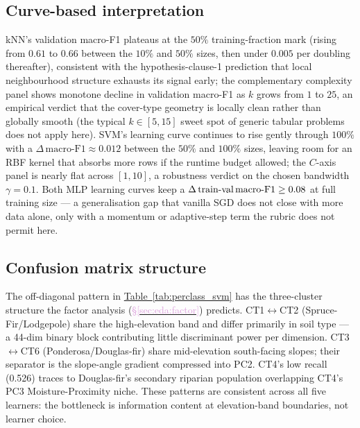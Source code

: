 \documentclass[conference]{IEEEtran}
\newcommand{\tabref}[1]{\hyperref[#1]{\textcolor{sage}{Table~\ref*{#1}}}}
\newcommand{\secref}[1]{\hyperref[#1]{\textcolor{plum}{\S\ref*{#1}}}}
\begin{document}
\subsection{Curve-based interpretation}\label{sec:disc:curves}
kNN's validation macro-F1 plateaus at the $50\%$ training-fraction mark
(rising from $0.61$ to $0.66$ between the $10\%$ and $50\%$ sizes, then under
$0.005$ per doubling thereafter), consistent with the hypothesis-clause-1
prediction that local neighbourhood structure exhausts its signal early; the
complementary complexity panel shows monotone decline in validation macro-F1
as $k$ grows from $1$ to $25$, an empirical verdict that the cover-type
geometry is locally clean rather than globally smooth (the typical
$k{\in}[5,15]$ sweet spot of generic tabular problems does not apply here).
SVM's learning curve continues to rise gently through $100\%$ with a
$\Delta\,\text{macro-F1}\approx 0.012$ between the $50\%$ and $100\%$ sizes,
leaving room for an RBF kernel that absorbs more rows if the runtime budget
allowed; the $C$-axis panel is nearly flat across $[1, 10]$, a robustness
verdict on the chosen bandwidth $\gamma{=}0.1$. Both MLP learning curves keep
a $\Delta\,\text{train{-}val\,macro-F1}\ge 0.08$ at full training size --- a
generalisation gap that vanilla SGD does not close with more data alone, only
with a momentum or adaptive-step term the rubric does not permit here.

\subsection{Confusion matrix structure}\label{sec:disc:cm}
The off-diagonal pattern in \tabref{tab:perclass_svm} has the three-cluster
structure the factor analysis (\secref{sec:eda:factor}) predicts.
CT1$\leftrightarrow$CT2 (Spruce-Fir/Lodgepole) share the high-elevation
band and differ primarily in soil type --- a 44-dim binary block contributing
little discriminant power per dimension.
CT3$\leftrightarrow$CT6 (Ponderosa/Douglas-fir) share mid-elevation
south-facing slopes; their separator is the slope-angle gradient compressed
into PC2.
CT4's low recall (0.526) traces to Douglas-fir's secondary riparian
population overlapping CT4's PC3 Moisture-Proximity niche.
These patterns are consistent across all five learners: the bottleneck is
information content at elevation-band boundaries, not learner choice.
\end{document}
